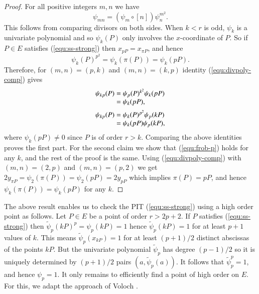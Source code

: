 \documentclass[review]{elsarticle}
\theoremstyle{plain}
\theoremstyle{definition}
\begin{document}
\begin{proof}
	For all positive integers $m, n$ we have
	\begin{equation}
	\label{equ:divpoly-comp}
		\psi_{mn} = (\psi_m \circ [n])\psi_n^{m^2}.
	\end{equation}
	This follows from comparing divisors on both sides. When $k < r$ is odd, $\psi_k$ is a 
	univariate polynomial and so $\psi_k(P)$ only involves the $x$-coordinate of $P$. So if $P \in 
	E$ satisfies (\ref{equ:ss-strong}) then $x_{pP} = x_{\pi P}$, and hence 
	\begin{equation}
	\label{equ:frob-p}
		\psi_k(P)^{p^2} = \psi_k(\pi(P)) = \psi_k(pP).
	\end{equation}
	Therefore, for $(m, n) = (p, k)$ and $(m, n) = (k, p)$ identity (\ref{equ:divpoly-comp}) gives
	\[
	\arraycolsep=1.4pt
	\begin{array}{rll}
		\psi_{kp}(P) & = & \psi_p(P)^{k^2} \psi_k(pP) \\
		& = & \psi_k(pP), \vspace*{2mm} \\		 
		\psi_{kp}(P) & = & \psi_k(P)^{p^2} \psi_p(kP) \\
		& = & \psi_k(pP) \psi_p(kP), \\
	\end{array}
	\]
	where $\psi_k(pP) \ne 0$ since $P$ is of order $r > k$. Comparing the above identities proves 
	the first part. For the second claim we show that (\ref{equ:frob-p}) holds for any $k$, and the 
	rest of the proof is the same. Using (\ref{equ:divpoly-comp}) with $(m, n) = (2, p)$ and $(m, 
	n) = (p, 2)$ we get $2y_{\pi P} = \psi_2(\pi(P)) = \psi_2(pP) = 2y_{pP}$ which implies $\pi(P) 
	= pP$, and hence $\psi_k(\pi(P)) = \psi_k(pP)$ for any $k$.
\end{proof}
The above result enables us to check the PIT (\ref{equ:ss-strong}) using a high order point as 
follows. Let $P \in E$ be a point of order $r > 2p + 2$. If $P$ satisfies (\ref{equ:ss-strong}) 
then $\tilde{\psi}_p(kP)^p = \psi_p(kP) = 1$ hence $\tilde{\psi}_p(kP) = 1$ for at least $p + 1$ 
values of $k$. This means $\tilde{\psi}_p(x_{kP}) = 1$ for at least $(p + 1) / 2$ distinct 
abscissas of the points $kP$. But the univariate polynomial $\tilde{\psi}_p$ has degree $(p - 1) / 
2$ so it is uniquely determined by $(p + 1) / 2$ pairs $(a, \tilde{\psi}_p(a))$. It follows that 
$\tilde{\psi}_p^p = 1$, and hence $\psi_p = 1$. It only remains to efficiently find a point of high 
order on $E$. For this, we adapt the approach of Voloch \cite{voloch2007,voloch2010}.
\end{document}

